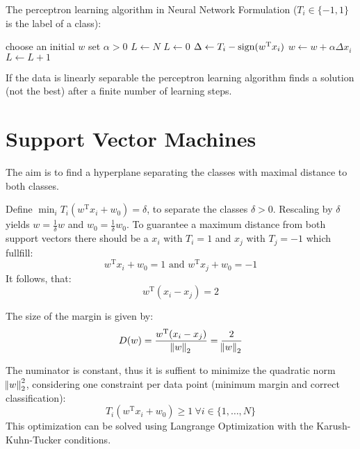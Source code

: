 The perceptron learning algorithm in Neural Network Formulation ($T_i \in \{-1, 1\}$ is the label of a class):
\begin{algorithmic}
    \State choose an initial $w$
    \State set $\alpha > 0$
    \State $L \gets N$
        $L \gets 0$
            \State $\Delta \gets T_i - \operatorname*{sign}(w^\text{T} x_i)$
                \State $w \gets w + \alpha \Delta x_i$
                \State $L \gets L + 1$
            \EndIf
        \EndFor
    \EndWhile
\end{algorithmic}

If the data is linearly separable the perceptron learning algorithm finds a solution (not the best) after a finite number of learning steps.


\section{Support Vector Machines}
The aim is to find a hyperplane separating the classes with maximal distance to both classes. 

Define $\min_i T_i (w^\text{T} x_i + w_0) = \delta$, to separate the classes $\delta > 0$. 
Rescaling by $\delta$ yields $w = \frac{1}{\delta} w$ and $w_0 = \frac{1}{\delta} w_0$.
To guarantee a maximum distance from both support vectors there should be a $x_i$ with $T_i = 1$ and $x_j$ with $T_j = -1$ which fullfill:
\begin{equation*}
    w^\text{T} x_i + w_0 = 1 \text{ and } w^\text{T} x_j + w_0 = -1
\end{equation*}
It follows, that:
\begin{equation*}
    w^\text{T} (x_i - x_j) = 2
\end{equation*}

The size of the margin is given by:
\begin{equation*}
    D(w) = \frac{w^\text{T} (x_i - x_j)}{\norm{w}_2} = \frac{2}{\norm{w}_2}
\end{equation*}

The numinator is constant, thus it is suffient to minimize the quadratic norm $\norm{w}_2^2$,
considering one constraint per data point (minimum margin and correct classification):
\begin{equation*}
    T_i (w^\text{T} x_i + w_0) \geq 1\ \forall i \in \{1, \ldots, N\}
\end{equation*}
This optimization can be solved using Langrange Optimization with the Karush-Kuhn-Tucker conditions.

